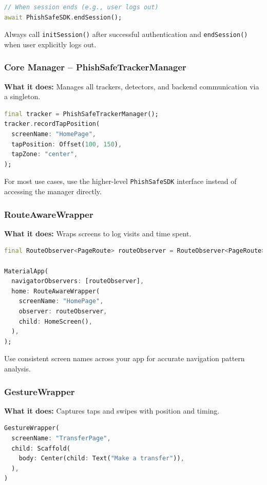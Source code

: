 \documentclass[11pt]{article}
\begin{document}
\begin{lstlisting}[language=Dart]
// When session ends (e.g., user logs out)
await PhishSafeSDK.endSession();
\end{lstlisting}

Always call \texttt{initSession()} after successful authentication and \texttt{endSession()} when user explicitly logs out.

\subsubsection{Core Manager – PhishSafeTrackerManager}
\textbf{What it does:} Manages all trackers, detectors, and backend communication via a singleton.

\begin{lstlisting}[language=Dart]
final tracker = PhishSafeTrackerManager();
tracker.recordTapPosition(
  screenName: "HomePage",
  tapPosition: Offset(100, 150),
  tapZone: "center",
);
\end{lstlisting}

For most use cases, use the higher-level \texttt{PhishSafeSDK} interface instead of accessing the manager directly.

\subsubsection{RouteAwareWrapper}
\textbf{What it does:} Wraps screens to log visits and time spent.

\begin{lstlisting}[language=Dart]
final RouteObserver<PageRoute> routeObserver = RouteObserver<PageRoute>();

MaterialApp(
  navigatorObservers: [routeObserver],
  home: RouteAwareWrapper(
    screenName: "HomePage",
    observer: routeObserver,
    child: HomeScreen(),
  ),
);
\end{lstlisting}

Use consistent screen names across your app for accurate navigation pattern analysis.

\subsubsection{GestureWrapper}
\textbf{What it does:} Captures taps and swipes with position and timing.

\begin{lstlisting}[language=Dart]
GestureWrapper(
  screenName: "TransferPage",
  child: Scaffold(
    body: Center(child: Text("Make a transfer")),
  ),
)
\end{lstlisting}
\end{document}
